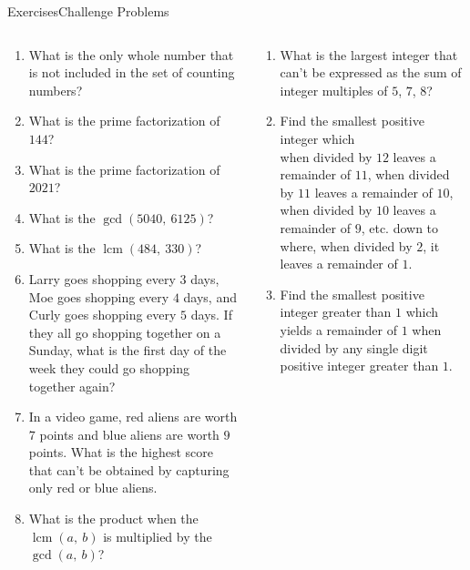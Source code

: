 \documentclass[9pt,aspectratio=169]{beamer}
\DeclareMathOperator{\lcm}{lcm}
\begin{document}
\begin{frame}{Exercises\hspace*{0.35\textwidth}Challenge Problems}
  \begin{columns}[T]
    \begin{column}{0.5\textwidth}
      \begin{enumerate}
        \item What is the only whole number that is not included in the set of counting numbers?
        \item What is the prime factorization of $144$?
        \item What is the prime factorization of $2021$?
        \item What is the $\gcd(5040,\ 6125)$?
        \item What is the $\lcm(484,\ 330)$?
        \item Larry goes shopping every $3$ days, Moe goes shopping every $4$ days, and Curly goes shopping every $5$ days.  If they all go shopping together on a Sunday, what is the first day of the week they could go shopping together again?
        \item In a video game, red aliens are worth $7$ points and blue aliens are worth $9$ points.  What is the highest score that can’t be obtained by capturing only red or blue aliens.
        \item What is the product when the $\lcm (a,\ b)$ is multiplied by the $\gcd (a,\ b)$?
      \end{enumerate}
    \end{column}
    \begin{column}{0.5\textwidth}
      \begin{enumerate}
        \item What is the largest integer that can’t be expressed as the sum of integer multiples of $5$, $7$, $8$?

        \item Find the smallest positive integer which\\ when divided by $12$ leaves a remainder of $11$, when divided by $11$ leaves a remainder of $10$, when divided by $10$ leaves a remainder of $9$, etc. down to where, when divided by $2$, it leaves a remainder of $1$.

        \item Find the smallest positive integer greater than $1$ which yields a remainder of $1$ when divided by any single digit positive integer greater than $1$.
      \end{enumerate}
    \end{column}
  \end{columns}
\end{frame}

\end{document}

